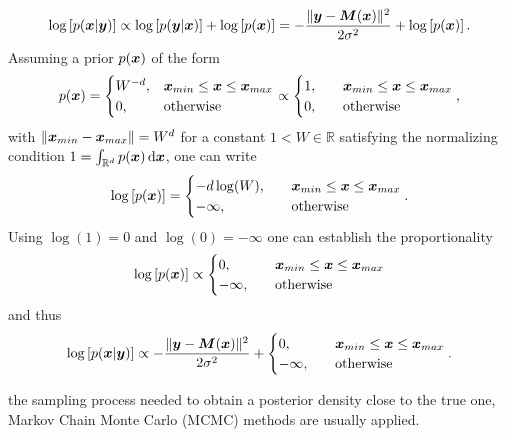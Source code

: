 \documentclass[a4paper,12pt]{report}
\def\lk#1{{\color{black}{#1}}}
\begin{document}
\begin{align}
\begin{aligned}
\log\left[p(\bm{x}|\bm{y})\right] \propto \log\left[p(\bm{y}|\bm{x})\right] + \log\left[p(\bm{x})\right] = -\frac{\|\bm{y}-\bm{M}(\bm{x}) \|^2}{2\sigma^2} + \log\left[p(\bm{x})\right].
\end{aligned}\end{align} Assuming a prior $p(\bm{x})$ of the form \begin{equation}
p(\bm{x}) = \begin{cases}
W^{-d}, &\bm{x}_{min} \leq \bm{x} \leq \bm{x}_{max} \\
0, \quad &\text{otherwise}
\end{cases} \propto \begin{cases}
1, &\bm{x}_{min} \leq \bm{x} \leq \bm{x}_{max} \\
0, \quad &\text{otherwise}
\end{cases},
\end{equation} with $\|\bm{x}_{min}-\bm{x}_{max}\| = W^d$ for a constant $1 < W \in \mathbb{R}$ satisfying the normalizing condition $1 = \int_{\mathbb{R}^d}p(\bm{x})\,\mathrm{d}\bm{x}$, one can write \begin{equation}
\log\left[p(\bm{x})\right] = \begin{cases} -d\log(W), \quad &\bm{x}_{min} \leq \bm{x} \leq \bm{x}_{max} \\
-\infty, \quad &\text{otherwise}  \end{cases}.
\end{equation} Using $\log(1) = 0$ and $\log(0) = -\infty$ one can establish the proportionality  \begin{equation}
\log\left[p(\bm{x})\right] \propto \begin{cases}
0, &\bm{x}_{min} \leq \bm{x} \leq \bm{x}_{max} \\
-\infty, \quad &\text{otherwise}
\end{cases}
\end{equation} and thus \begin{equation}
\log\left[p(\bm{x}|\bm{y})\right] \propto -\frac{\|\bm{y}-\bm{M}(\bm{x})\|^2}{2\sigma^2} + \begin{cases}
0, &\bm{x}_{min} \leq \bm{x} \leq \bm{x}_{max} \\
-\infty, \quad &\text{otherwise}
\end{cases}.
\end{equation}

\lk{For} the sampling process needed to obtain a posterior density close to the true one, Markov Chain Monte Carlo (MCMC) methods are usually applied.
\end{document}
